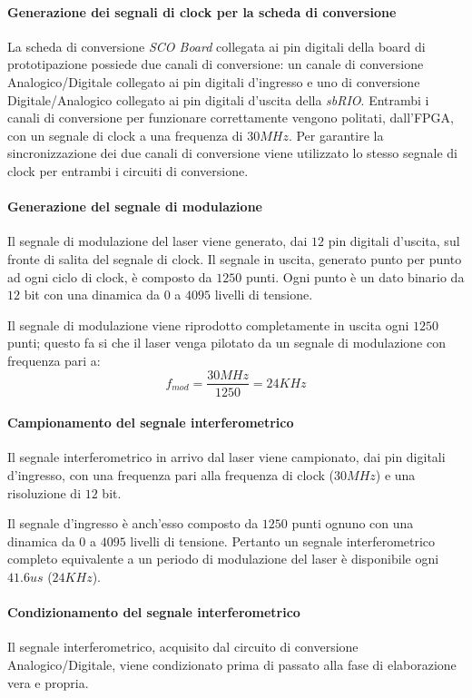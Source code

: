 \paragraph{Generazione dei segnali di clock per la scheda di conversione}
La scheda di conversione \textit{SCO Board} collegata ai pin digitali della board di prototipazione possiede due canali di conversione: un canale di conversione Analogico/Digitale collegato ai pin digitali d'ingresso e uno di conversione Digitale/Analogico collegato ai pin digitali d'uscita della \textit{sbRIO}. Entrambi i canali di conversione per funzionare correttamente vengono politati, dall'FPGA, con un segnale di clock a una frequenza di $30MHz$. Per garantire la sincronizzazione dei due canali di conversione viene utilizzato lo stesso segnale di clock per entrambi i circuiti di conversione.

\paragraph{Generazione del segnale di modulazione}
Il segnale di modulazione del laser viene generato, dai $12$ pin digitali d'uscita, sul fronte di salita del segnale di clock. Il segnale in uscita, generato punto per punto ad ogni ciclo di clock, è composto da $1250$ punti. Ogni punto è un dato binario da $12$ bit con una dinamica da $0$ a $4095$ livelli di tensione.

Il segnale di modulazione viene riprodotto completamente in uscita ogni $1250$ punti; questo fa si che il laser venga pilotato da un segnale di modulazione con frequenza pari a:
\begin{equation}
	f_{mod} = \frac{30MHz}{1250} = 24KHz
\end{equation}

\paragraph{Campionamento del segnale interferometrico}
Il segnale interferometrico in arrivo dal laser viene campionato, dai pin digitali d'ingresso, con una frequenza pari alla frequenza di clock ($30MHz$) e una risoluzione di $12$ bit.

Il segnale d'ingresso è anch'esso composto da $1250$ punti ognuno con una dinamica da $0$ a $4095$ livelli di tensione. Pertanto un segnale interferometrico completo equivalente a un periodo di modulazione del laser è disponibile ogni $41.6us$ ($24KHz$).

\paragraph{Condizionamento del segnale interferometrico}
Il segnale interferometrico, acquisito dal circuito di conversione Analogico/Digitale, viene condizionato prima di passato alla fase di elaborazione vera e propria.

